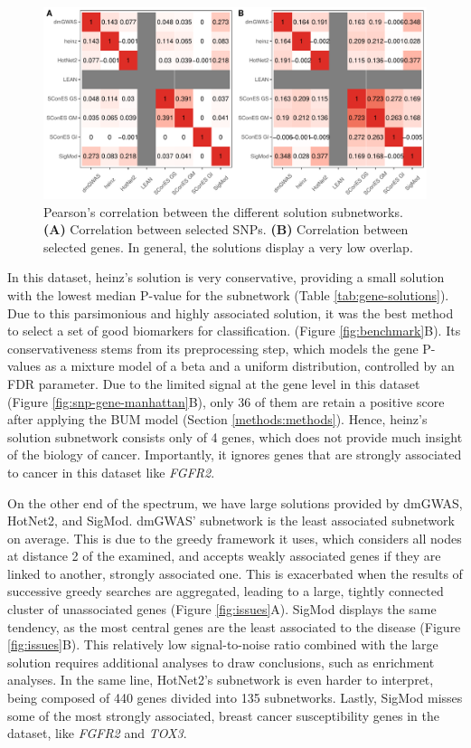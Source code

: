 \documentclass[
  11pt,
]{env/yjiao}
\begin{document}
\begin{figure}
\centering
\includegraphics{fig/sfigure_6.pdf}
\caption{\label{fig:pearson-methods}Pearson's correlation between the different solution subnetworks. \textbf{(A)} Correlation between selected SNPs. \textbf{(B)} Correlation between selected genes. In general, the solutions display a very low overlap.}
\end{figure}

In this dataset, heinz's solution is very conservative, providing a
small solution with the lowest median P-value for the subnetwork (Table
\ref{tab:gene-solutions}). Due to this parsimonious and highly
associated solution, it was the best method to select a set of good
biomarkers for classification. (Figure \ref{fig:benchmark}B).
Its conservativeness stems from its
preprocessing step, which models the gene P-values as a mixture model of
a beta and a uniform distribution, controlled by an FDR parameter. Due
to the limited signal at the gene level in this dataset (Figure
\ref{fig:snp-gene-manhattan}B), only 36 of them are retain a
positive score after applying the BUM model (Section
\ref{methods:methods}). Hence, heinz's solution subnetwork
consists only of 4 genes, which does not provide much insight of the
biology of cancer. Importantly, it ignores genes that are strongly
associated to cancer in this dataset like \emph{FGFR2}.

On the other end of the spectrum, we have large solutions provided by
dmGWAS, HotNet2, and SigMod. dmGWAS' subnetwork is the least associated
subnetwork on average. This is due to the greedy framework it uses,
which considers all nodes at distance 2 of the examined, and accepts
weakly associated genes if they are linked to another, strongly
associated one. This is exacerbated when the results of successive
greedy searches are aggregated, leading to a large, tightly connected
cluster of unassociated genes (Figure \ref{fig:issues}A).
SigMod displays the same tendency, as the
most central genes are the least associated to the disease (Figure
\ref{fig:issues}B). This relatively low signal-to-noise ratio
combined with the large solution requires additional analyses to draw
conclusions, such as enrichment analyses. In the same line, HotNet2's
subnetwork is even harder to interpret, being composed of 440 genes
divided into 135 subnetworks. Lastly, SigMod misses some of the most
strongly associated, breast cancer susceptibility genes in the dataset,
like \emph{FGFR2} and \emph{TOX3}.
\end{document}
